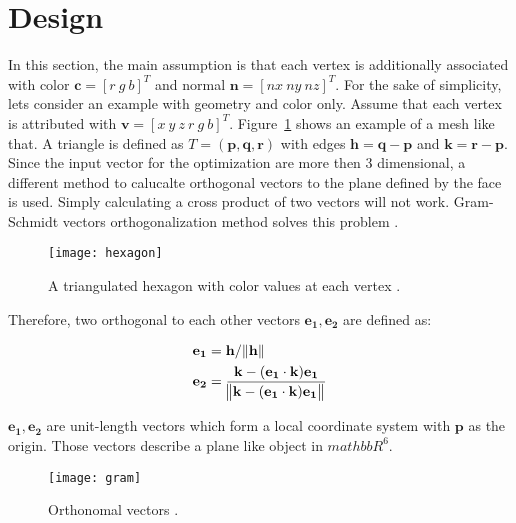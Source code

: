 \section{Design}
In this section, the main assumption is that each vertex is additionally associated with color $\mathbf{c} = [r \ g \ b]^T$ and normal $\mathbf{n} = [nx \ ny \ nz]^T$. For the sake of simplicity, lets consider an example with geometry and color only. Assume that each vertex is attributed with $\mathbf{v} = [x \ y \ z \ r \ g \ b]^T$. Figure~\ref{fig:hexagon} shows an example of a mesh like that. A triangle is defined as $T = (\mathbf{p}, \mathbf{q}, \mathbf{r})$ with edges $\mathbf{h} = \mathbf{q} - \mathbf{p}$ and $\mathbf{k} = \mathbf{r} - \mathbf{p}$. Since the input vector for the optimization are more then 3 dimensional, a different method to calucalte orthogonal vectors to the plane defined by the face is used. Simply calculating a cross product of two vectors will not work. Gram-Schmidt vectors orthogonalization method solves this problem \cite{strang88}.

\begin{figure}[H]
  \begin{center}
    \texttt{[image: hexagon]}
    \caption{A triangulated hexagon with color values at each vertex \cite{garland99}.}
    \label{fig:hexagon}
  \end{center}
\end{figure}

Therefore, two orthogonal to each other vectors $\mathbf{e_1}, \mathbf{e_2}$ are defined as:

\begin{align}
\mathbf{e_1} &= \mathbf{h} / \norm{\mathbf{h}} \\
\mathbf{e_2} &= \frac{\mathbf{k} - (\mathbf{e_1} \cdot \mathbf{k})\mathbf{e_1}}{\norm{\mathbf{k} - (\mathbf{e_1} \cdot \mathbf{k})\mathbf{e_1}}}
\end{align}

$\mathbf{e_1}, \mathbf{e_2}$ are unit-length vectors which form a local coordinate system with $\mathbf{p}$ as the origin. Those vectors describe a plane like object in $mathbb{R}^6$.

\begin{figure}[H]
  \begin{center}
    \texttt{[image: gram]}
    \caption{Orthonomal vectors \cite{garland99}.}
    \label{fig:gram}
  \end{center}
\end{figure}

